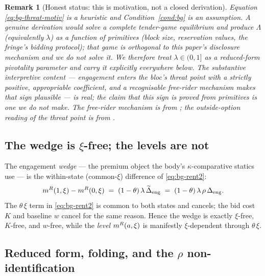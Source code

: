 \documentclass[11pt]{article}
\newcommand{\1}{\mathbf{1}}
\newtheorem{remark}{Remark}
\begin{document}
\begin{remark}[Honest status: this is motivation, not a closed derivation]
\label{rem:bg-threat-honest}
Equation \eqref{eq:bg-threat-motiv} is a heuristic and Condition~\ref{cond:bg} is an \emph{assumption}. A genuine derivation would solve a complete tender-game equilibrium and produce $\Lambda$ (equivalently $\lambda$) as a function of primitives (block size, reservation values, the fringe's bidding protocol); that game is orthogonal to this paper's disclosure mechanism and we do not solve it. We therefore treat $\lambda\in(0,1]$ as a reduced-form pivotality parameter and carry it explicitly everywhere below. The substantive interpretive content --- engagement enters the bloc's threat point with a strictly positive, appropriable coefficient, and a recognisable free-rider mechanism makes that sign plausible --- is real; the claim that this sign is \emph{proved} from primitives is one we do not make. The free-rider mechanism is from \citet{GrossmanHart1980}; the outside-option reading of the threat point is from \citet{BinmoreRubinsteinWolinsky1986}.
\end{remark}

\subsection{The wedge is \texorpdfstring{$\xi$}{xi}-free; the levels are not}
\label{app:bg-wedge}

The engagement \emph{wedge} --- the premium object the body's $\kappa$-comparative statics use --- is the within-state (common-$\xi$) difference of \eqref{eq:bg-rent2}:
\begin{equation}
  \label{eq:bg-wedge}
  m^{R}(1,\xi)-m^{R}(0,\xi)\;=\;(1-\theta)\,\lambda\,\widetilde{\Delta}_{\mathrm{eng}}
  \;=\;(1-\theta)\,\lambda\,\rho\,\Delta_{\mathrm{eng}} .
\end{equation}
The $\theta\,\xi$ term in \eqref{eq:bg-rent2} is common to both states and cancels; the bid cost $K$ and baseline $w$ cancel for the same reason. Hence the wedge is exactly $\xi$-free, $K$-free, and $w$-free, while the \emph{level} $m^{R}(a,\xi)$ is manifestly $\xi$-dependent through $\theta\,\xi$.

\subsection{Reduced form, folding, and the \texorpdfstring{$\rho$}{rho} non-identification}
\label{app:bg-reduced}
\end{document}
